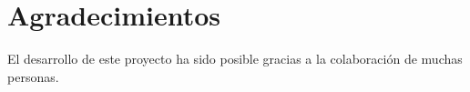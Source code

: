 


\bigskip


\begingroup

\let\clearpage\relax
\let\cleardoublepage\relax
\let\cleardoublepage\relax

\chapter*{Agradecimientos} %
\noindent El desarrollo de este proyecto ha sido posible gracias a la colaboración de muchas personas. 

\endgroup
